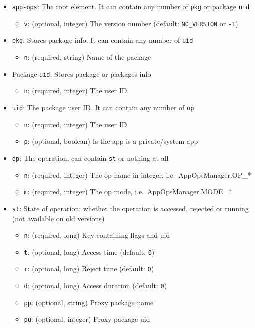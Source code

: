 \begin{itemize}
    \item \texttt{app-ops}: The root element. It can contain any number of \texttt{pkg} or package \texttt{uid}
    \begin{itemize}
        \item \texttt{v}: (optional, integer) The version number (default: \texttt{NO\_VERSION} or \texttt{-1})
    \end{itemize}

    \item \texttt{pkg}: Stores package info. It can contain any number of \texttt{uid}
    \begin{itemize}
        \item \texttt{n}: (required, string) Name of the package
    \end{itemize}

    \item Package \texttt{uid}: Stores package or packages info
    \begin{itemize}
        \item \texttt{n}: (required, integer) The user ID
    \end{itemize}

    \item \texttt{uid}: The package user ID. It can contain any number of \texttt{op}
    \begin{itemize}
        \item \texttt{n}: (required, integer) The user ID
        \item \texttt{p}: (optional, boolean) Is the app is a private/system app
    \end{itemize}

    \item \texttt{op}: The operation, can contain \texttt{st} or nothing at all
    \begin{itemize}
        \item \texttt{n}: (required, integer) The op name in integer, i.e.\ AppOpsManager.OP\_*
        \item \texttt{m}: (required, integer) The op mode, i.e.\ AppOpsManager.MODE\_*
    \end{itemize}

    \item \texttt{st}: State of operation: whether the operation is accessed, rejected or running (not available on old versions)
    \begin{itemize}
        \item \texttt{n}: (required, long) Key containing flags and uid
        \item \texttt{t}: (optional, long) Access time (default: \texttt{0})
        \item \texttt{r}: (optional, long) Reject time (default: \texttt{0})
        \item \texttt{d}: (optional, long) Access duration (default: \texttt{0})
        \item \texttt{pp}: (optional, string) Proxy package name
        \item \texttt{pu}: (optional, integer) Proxy package uid
    \end{itemize}
\end{itemize}


